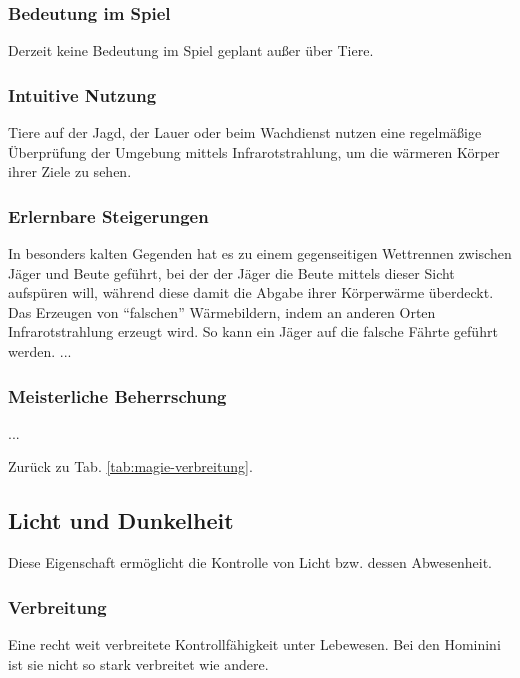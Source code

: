 \subsubsection{Bedeutung im Spiel}
Derzeit keine Bedeutung im Spiel geplant außer über Tiere.

\subsubsection{Intuitive Nutzung}
Tiere auf der Jagd, der Lauer oder beim Wachdienst nutzen eine regelmäßige Überprüfung der Umgebung mittels Infrarotstrahlung, um die wärmeren Körper ihrer Ziele zu sehen.


\subsubsection{Erlernbare Steigerungen}
\begin{outline}
	\1 In besonders kalten Gegenden hat es zu einem gegenseitigen Wettrennen zwischen Jäger und Beute geführt, bei der der Jäger die Beute mittels dieser Sicht aufspüren will, während diese damit die Abgabe ihrer Körperwärme überdeckt.
	\1 Das Erzeugen von "`falschen"' Wärmebildern, indem an anderen Orten Infrarotstrahlung erzeugt wird.
	So kann \zB ein Jäger auf die falsche Fährte geführt werden.
	\1 ...
\end{outline}

\subsubsection{Meisterliche Beherrschung} 
\begin{outline}
	\1 ...
\end{outline}
Zurück zu Tab. \ref{tab:magie-verbreitung}.



\subsection{Licht und Dunkelheit} \label{sec:lichtmagie}
Diese Eigenschaft ermöglicht die Kontrolle von Licht bzw. dessen Abwesenheit.

\subsubsection{Verbreitung}
Eine recht weit verbreitete Kontrollfähigkeit unter Lebewesen. 
Bei den Hominini ist sie nicht so stark verbreitet wie andere.

